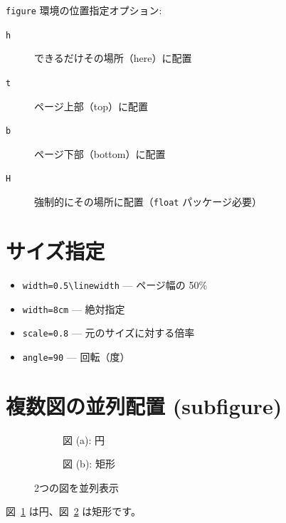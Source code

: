 \documentclass[lualatex,ja=standard]{bxjsarticle}
\begin{document}
\texttt{figure} 環境の位置指定オプション:

\begin{description}
  \item[\texttt{h}] できるだけその場所（here）に配置
  \item[\texttt{t}] ページ上部（top）に配置
  \item[\texttt{b}] ページ下部（bottom）に配置
  \item[\texttt{H}] 強制的にその場所に配置（\texttt{float} パッケージ必要）
\end{description}

\section{サイズ指定}

\begin{itemize}
  \item \texttt{width=0.5\textbackslash linewidth} --- ページ幅の 50\%
  \item \texttt{width=8cm} --- 絶対指定
  \item \texttt{scale=0.8} --- 元のサイズに対する倍率
  \item \texttt{angle=90} --- 回転（度）
\end{itemize}

\section{複数図の並列配置 (subfigure)}

\begin{figure}[h]
  \centering
  \begin{subfigure}[b]{0.45\linewidth}
    \centering
    \caption{図 (a): 円}
    \label{fig:circle}
  \end{subfigure}
  \hfill
  \begin{subfigure}[b]{0.45\linewidth}
    \centering
    \caption{図 (b): 矩形}
    \label{fig:rect}
  \end{subfigure}
  \caption{2つの図を並列表示}
  \label{fig:two}
\end{figure}

図~\ref{fig:circle} は円、図~\ref{fig:rect} は矩形です。
\end{document}
